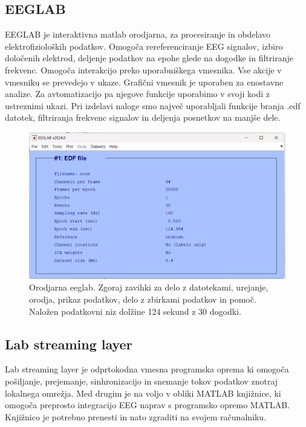 \subsection{EEGLAB}
EEGLAB je interaktivna matlab orodjarna, za procesiranje in obdelavo elektrofizioloških podatkov. Omogoča rereferenciranje EEG signalov, izbiro določenih elektrod, deljenje podatkov na epohe glede na dogodke in filtriranje frekvenc. Omogoča interakcijo preko uporabniškega vmesnika. Vse akcije v vmesniku se prevedejo v ukaze. Grafični vmesnik je uporaben za enostavne analize. Za avtomatizacijo pa njegove funkcije uporabimo v svoji kodi z ustreznimi ukazi. Pri izdelavi naloge smo največ uporabljali funkcije branja .edf datotek, filtriranja frekvenc signalov in deljenja posnetkov na manjše dele.\cite{EEGLAB}
\begin{figure}[h!]
    \begin{center}
    \includegraphics[width=1\linewidth]{slike/EEGLAB.png}
    \end{center}
    \caption{Orodjarna eeglab. Zgoraj zavihki za delo z datotekami, urejanje, orodja, prikaz podatkov, delo z zbirkami podatkov in pomoč. Naložen podatkovni niz dolžine 124 sekund z 30 dogodki.}
    \end{figure}

\subsection{Lab streaming layer}
Lab streaming layer je odprtokodna vmesna programska oprema ki omogoča pošiljanje, prejemanje, sinhronizacijo in snemanje tokov podatkov znotraj lokalnega omrežja. Med drugim je na voljo v obliki MATLAB knjižnice, ki omogoča preprosto integracijo EEG naprav s programsko opremo MATLAB. Knjižnico je potrebno prenesti in nato zgraditi na svojem računalniku.  \cite{Lslwebsite}

